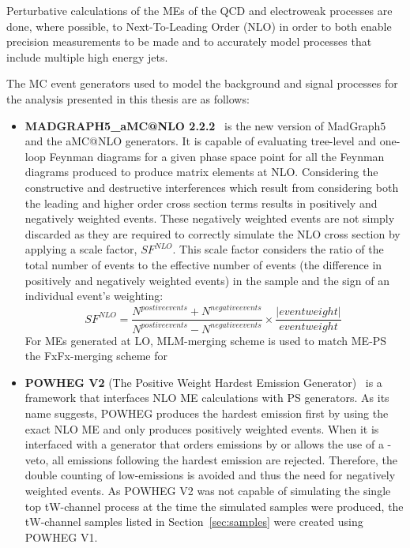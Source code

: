 Perturbative calculations of the MEs of the QCD and electroweak processes are done, where possible, to Next-To-Leading Order (NLO) in order to both enable precision measurements to be made and to accurately model processes that include multiple high energy jets.

The MC event generators used to model the background and signal processes for the analysis presented in this thesis are as follows:

\begin{itemize}
\item \textbf{MADGRAPH5\_aMC@NLO 2.2.2}~\cite{Alwall:2014hca} is the new version of MadGraph$5$ and the aMC@NLO generators.
It is capable of evaluating tree-level and one-loop Feynman diagrams for a given phase space point for all the Feynman diagrams produced to produce matrix elements at NLO.
Considering the constructive and destructive interferences which result from considering both the leading and higher order cross section terms results in positively and negatively weighted events.
These negatively weighted events are not simply discarded as they are required to correctly simulate the NLO cross section by applying a scale factor, $SF^{NLO}$.
This scale factor considers the ratio of the total number of events to the effective number of events (\ie the difference in positively and negatively weighted events) in the sample and the sign of an individual event's weighting:
\begin{equation}
SF^{NLO} = \frac{N^{postive events} + N^{negative events}}{N^{postive events} - N^{negative events}} \times \frac{|event weight|}{event weight} \;
\end{equation}
For MEs generated at LO, MLM-merging scheme is used to match ME-PS the FxFx-merging scheme for 

\item \textbf{POWHEG V2} (The Positive Weight Hardest Emission Generator)~\cite{Alioli:2010xd} is a framework that interfaces NLO ME calculations with PS generators.
As its name suggests, POWHEG produces the hardest emission first by using the exact NLO ME and only produces positively weighted events.
When it is interfaced with a generator that orders emissions by \pT or allows the use of a \pT-veto, all emissions following the hardest emission are rejected.
Therefore, the double counting of low-\pT emissions is avoided and thus the need for negatively weighted events.
As POWHEG V2 was not capable of simulating the single top tW-channel process at the time the simulated samples were produced, the tW-channel samples listed in Section~\ref{sec:samples} were created using POWHEG V1.


\end{itemize}

